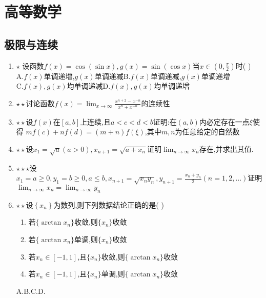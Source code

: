 \documentclass[12pt, a4paper, oneside, UTF8]{ctexbook}
\begin{document}
% 
\else
\fi
\chapter{高等数学}

\section{极限与连续}
\begin{enumerate}
    \item $\star$ 设函数$f(x)=\cos{(\sin{x})},g(x)=\sin{(\cos{x})}$当$\displaystyle x\in\left(0,\frac{\pi}{2}\right)$时(  ) \\
    A.$f(x)$单调递增,$g(x)$单调递减\qquad B.$f(x)$单调递减,$g(x)$单调递增 \\
    C.$f(x),g(x)$均单调递减\qquad\qquad\quad D.$f(x),g(x)$均单调递增

    \item $\star\star$讨论函数$f(x)=\displaystyle \lim_{x\to\infty}\frac{x^{n+2}-x^{-n}}{x^n+x^{-n}}$的连续性

    \item $\star\star$设$f(x)$在$\left[a,b\right]$上连续,且$a<c<d<b$证明:在$\left(a,b\right)$内必定存在一点$\xi$使得
    $mf(c)+nf(d)=(m+n)f(\xi)$,其中$m,n$为任意给定的自然数 

    \item $\star\star$设$x_1=\sqrt{a}(a>0),x_{n+1}=\sqrt{a+x_n}$证明$\lim_{n\to\infty}x_n$存在,并求出其值. 
    
    \item $\star\star\star$设$x_1=a\geq 0,y_1=b\geq 0, a\leq b, x_{n+1}=\sqrt{x_ny_n},\displaystyle y_{n+1}=\frac{x_n+y_n}{2}(n=1,2,\ldots)$证明
    $\displaystyle \lim_{n\to\infty}x_n=\lim_{n\to\infty}y_n$

    \item $\star\star$设$\left\{x_n\right\}$为数列,则下列数据结论正确的是(  ) 
    \begin{enumerate}
        \item [\ding{172}] 若$\{\arctan{x_n}\}$收敛,则$\{x_n\}$收敛 
        \item [\ding{173}] 若$\{\arctan{x_n}\}$单调,则$\{x_n\}$收敛 
        \item [\ding{174}] 若$x_n\in\left[-1,1\right]$,且$\{x_n\}$收敛,则$\{\arctan{x_n}\}$收敛
        \item [\ding{175}] 若$x_n\in\left[-1,1\right]$,且$\{x_n\}$单调,则$\{\arctan{x_n}\}$收敛
    \end{enumerate}
    A.\qquad B.\qquad C.\qquad D.


\end{enumerate}
\end{document}
